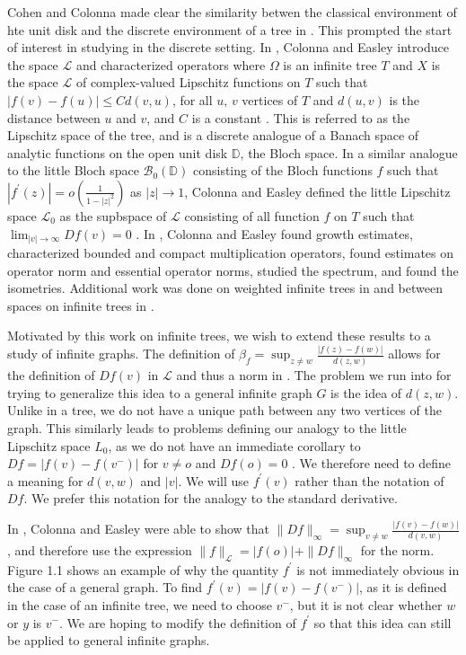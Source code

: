 \documentclass[11 pt]{report}
\theoremstyle{definition}
\theoremstyle{definition}
\begin{document}
\indent Cohen and Colonna made clear the similarity betwen the classical environment of hte unit disk and the discrete environment of a tree in \cite{CC94}. This prompted the start of interest in studying in the discrete setting. In \cite{Tree}, Colonna and Easley introduce the space $\mathcal{L}$ and characterized operators where $\Omega$ is an infinite tree $T$ and $X$ is the space $\mathcal{L}$ of complex-valued Lipschitz functions on $T$ such that $|f(v) - f(u)| \le C d(v,u)$, for all $u,\,v$ vertices of $T$ and $d(u,v)$ is the distance between $u$ and $v$, and $C$ is a constant \cite{Tree}. This is referred to as the Lipschitz space of the tree, and is a discrete analogue of a Banach space of analytic functions on the open unit disk $\mathbb{D}$, the Bloch space. In a similar analogue to the little Bloch space $\mathcal{B}_0 (\mathbb{D})$ consisting of the Bloch functions $f$ such that $|f^\prime (z)| = o(\frac{1}{1-|z|^2})$ as $|z| \to 1$, Colonna and Easley defined the little Lipschitz space $\mathcal{L}_0$ as the supbspace of $\mathcal{L}$ consisting of all function $f$ on $T$ such that $\lim_{|v| \to \infty} Df(v) = 0$ \cite{Tree}. In \cite{Tree}, Colonna and Easley found growth estimates, characterized bounded and compact multiplication operators, found estimates on operator norm and essential operator norms, studied the spectrum, and found the isometries. Additional work was done on weighted infinite trees in \cite{Weighted} and between spaces on infinite trees in \cite{Between}.

\indent Motivated by this work on infinite trees, we wish to extend these results to a study of infinite graphs. The definition of $\beta _f = \sup_{z \neq w} \frac{|f(z) - f(w)|}{d(z,w)}$ allows for the definition of $Df(v)$ in $\mathcal{L}$ and thus a norm in \cite{Weighted}. The problem we run into for trying to generalize this idea to a general infinite graph $G$ is the idea of $d(z,w)$. Unlike in a tree, we do not have a unique path between any two vertices of the graph. This similarly leads to problems defining our analogy to the little Lipschitz space $L_0$, as we do not have an immediate corollary to $Df = |f(v) - f(v^-)|$ for $v \neq o$ and $Df(o)=0$ \cite{Tree}. We therefore need to define a meaning for $d(v,w)$ and $|v|$. We will use $f^\prime (v)$ rather than the notation of $Df$. We prefer this notation for the analogy to the standard derivative. 

\indent In \cite{Tree}, Colonna and Easley were able to show that $\|Df\|_\infty = \sup_{v\neq w} \frac{|f(v)-f(w)|}{d(v,w)}$, and therefore use the expression $\|f\|_\mathcal{L} = |f(o)|+\|Df\|_\infty$ for the norm. Figure 1.1 shows an example of why the quantity $f^\prime$ is not immediately obvious in the case of a general graph. To find $f^\prime(v)=|f(v)-f(v^-)|$, as it is defined in the case of an infinite tree, we need to choose $v^-$, but it is not clear whether $w$ or $y$ is $v^-$. We are hoping to modify the definition of $f^\prime$ so that this idea can still be applied to general infinite graphs.
\end{document}
